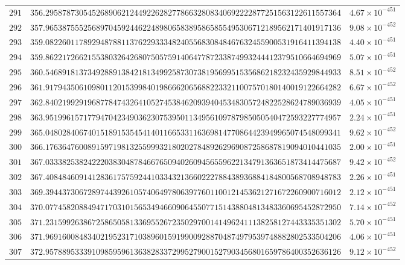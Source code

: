 \documentclass[12pt,reqno]{amsart}
\theoremstyle{remark}
\begin{document}
\begin{longtable}{clc}
$291$ & $356.2958787305452689062124492262827786632808340692222877251563122611557364$ & $4.67\times 10^{-451}$ \\
$292$ & $357.9653875552568970459244622489806583895865855495306712189562171401917136$ & $9.08\times 10^{-452}$ \\
$293$ & $359.0822601178929487881137622933348240556830848467632455900531916411394138$ & $4.40\times 10^{-451}$ \\
$294$ & $359.8622172662155380326426807505759140647787233874993244412379510664694969$ & $5.07\times 10^{-451}$ \\
$295$ & $360.5468918137349288913842181349925873073819569951535686218232435929844933$ & $8.51\times 10^{-452}$ \\
$296$ & $361.9179435061098011201539984019866620656882233211007570180140019122664282$ & $6.67\times 10^{-452}$ \\
$297$ & $362.8402199291968778474326410527453846209394045348305724822528624789036939$ & $4.05\times 10^{-451}$ \\
$298$ & $363.9519961571779470423490362307539501134956109787985050540472593227774957$ & $2.24\times 10^{-451}$ \\
$299$ & $365.0480284067401518915354541401166533116369814770864423949965074548099341$ & $9.62\times 10^{-452}$ \\
$300$ & $366.1763647600891597198132559993218020278489262969087258687819094010441035$ & $2.00\times 10^{-451}$ \\
$301$ & $367.0333825382422203830487846676509402609456559622134791363651873414475687$ & $9.42\times 10^{-452}$ \\
$302$ & $367.4084846091412836175759244103343213660222788438936884184800568708948783$ & $2.26\times 10^{-451}$ \\
$303$ & $369.3944373067289744392610574064978063977601100121453621271672260900716012$ & $2.12\times 10^{-451}$ \\
$304$ & $370.0774582088494717031015653494660906455077151438804813483360695452872950$ & $7.14\times 10^{-452}$ \\
$305$ & $371.2315992638672586505813369552672350297001414962411138258127443335351302$ & $5.70\times 10^{-451}$ \\
$306$ & $371.9691600848340219523171038960159199009288704874979539748882802533504206$ & $4.06\times 10^{-451}$ \\
$307$ & $372.9578895333910985959613638283372995279001527903456801659786400352636126$ & $9.12\times 10^{-452}$ \\

\end{longtable}
\end{document}

